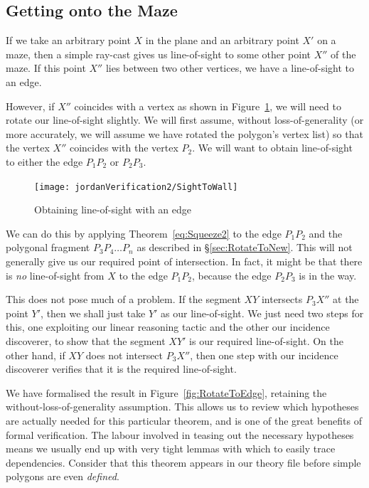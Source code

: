\subsection{Getting onto the Maze}
If we take an arbitrary point $X$ in the plane and an arbitrary point $X'$ on a maze, then a simple ray-cast gives us line-of-sight to some other point $X''$ of the maze. If this point $X''$ lies between two other vertices, we have a line-of-sight to an edge. 

However, if $X''$ coincides with a vertex as shown in Figure~\ref{fig:SightToEdge}, we will need to rotate our line-of-sight slightly. We will first assume, without loss-of-generality (or more accurately, we will assume we have rotated the polygon's vertex list) so that the vertex $X''$ coincides with the vertex $P_2$. We will want to obtain line-of-sight to either the edge $P_1P_2$ or $P_2P_3$.

\begin{figure}
  \centering\texttt{[image: jordanVerification2/SightToWall]}
  \caption{Obtaining line-of-sight with an edge}
  \label{fig:SightToEdge}
\end{figure}

We can do this by applying Theorem~\ref{eq:Squeeze2} to the edge $P_1P_2$ and the polygonal fragment $P_3P_4\ldots P_n$ as described in \S\ref{sec:RotateToNew}. This will not generally give us our required point of intersection. In fact, it might be that there is \emph{no} line-of-sight from $X$ to the edge $P_1P_2$, because the edge $P_2P_3$ is in the way. 

This does not pose much of a problem. If the segment $XY$ intersects $P_3X''$ at the point $Y'$, then we shall just take $Y'$ as our line-of-sight. We just need two steps for this, one exploiting our linear reasoning tactic and the other our incidence discoverer, to show that the segment $XY'$ is our required line-of-sight. On the other hand, if $XY$ does not intersect $P_3X''$, then one step with our incidence discoverer verifies that it is the required line-of-sight. 

We have formalised the result in Figure~\ref{fig:RotateToEdge}, retaining the without-loss-of-generality assumption. This allows us to review which hypotheses are actually needed for this particular theorem, and is one of the great benefits of formal verification. The labour involved in teasing out the necessary hypotheses means we usually end up with very tight lemmas with which to easily trace dependencies. Consider that this theorem appears in our theory file before simple polygons are even \emph{defined}.

